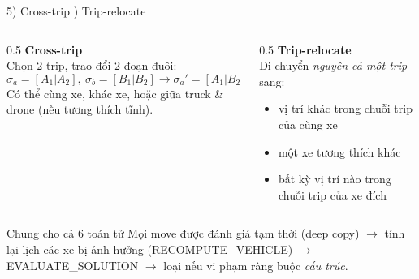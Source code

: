 \documentclass[aspectratio=169]{beamer}
\begin{document}
\begin{frame}{5) Cross-trip ) Trip-relocate}
  \begin{columns}[T]
    \begin{column}{0.5\textwidth}
      \textbf{Cross-trip}\\
      \small Chọn 2 trip, trao đổi 2 đoạn đuôi:
      $$\sigma_a=[A_1|A_2],\ \sigma_b=[B_1|B_2] \to \sigma_a'=[A_1|B_2],\ \sigma_b'=[B_1|A_2]$$
      \small Có thể cùng xe, khác xe, hoặc giữa truck \& drone (nếu tương thích tĩnh).
    \end{column}
    \begin{column}{0.5\textwidth}
      \textbf{Trip-relocate}\\
      \small Di chuyển \emph{nguyên cả một trip} sang:
      \begin{itemize}
        \item vị trí khác trong chuỗi trip của cùng xe
        \item một xe tương thích khác
        \item bất kỳ vị trí nào trong chuỗi trip của xe đích
      \end{itemize}
    \end{column}
  \end{columns}
  \vspace{3mm}
  \begin{alertblock}{Chung cho cả 6 toán tử}
    Mọi move được đánh giá tạm thời (deep copy) $\to$ tính lại lịch các xe bị ảnh hưởng (RECOMPUTE\_VEHICLE) $\to$ EVALUATE\_SOLUTION $\to$ loại nếu vi phạm ràng buộc \emph{cấu trúc}.
  \end{alertblock}
\end{frame}
\end{document}
